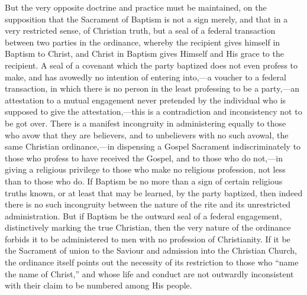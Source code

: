 \documentclass[english,]{book}
\begin{document}
But the very opposite doctrine and practice must be maintained, on the supposition that the Sacrament of Baptism is not a sign merely, and that in a very restricted sense, of Christian truth, but a seal of a federal transaction between two parties in the ordinance, whereby the recipient gives himself in Baptism to Christ, and Christ in Baptism gives Himself and His grace to the recipient. A seal of a covenant which the party baptized does not even profess to make, and has avowedly no intention of entering into,---a voucher to a federal transaction, in which there is no person in the least professing to be a party,---an attestation to a mutual engagement never pretended by the individual who is supposed to give the attestation,---this is a contradiction and inconsistency not to be got over. There is a manifest incongruity in administering equally to those who avow that they are believers, and to unbelievers with no such avowal, the same Christian ordinance,---in dispensing a Gospel Sacrament indiscriminately to those who profess to have received the Gospel, and to those who do not,---in giving a religious privilege to those who make no religious profession, not less than to those who do. If Baptism be no more than a sign of certain religious truths known, or at least that may be learned, by the party baptized, then indeed there is no such incongruity between the nature of the rite and its unrestricted administration. But if Baptism be the outward seal of a federal engagement, distinctively marking the true Christian, then the very nature of the ordinance forbids it to be administered to men with no profession of Christianity. If it be the Sacrament of union to the Saviour and admission into the Christian Church, the ordinance itself points out the necessity of its restriction to those who ``name the name of Christ,'' and whose life and conduct are not outwardly inconsistent with their claim to be numbered among His people.
\end{document}
